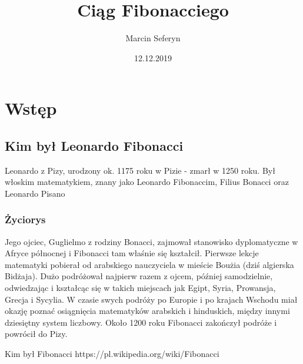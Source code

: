 \documentclass{report}
\title{Ciąg Fibonacciego}
\author{Marcin Seferyn}
\date{12.12.2019}
\begin{document}
\maketitle
\newpage
\tableofcontents
\newpage
\chapter{Wstęp}
\section{Kim był Leonardo Fibonacci}
\cite{fib}
Leonardo z Pizy, urodzony ok. 1175 roku w Pizie - zmarł w 1250 roku. Był włoskim matematykiem, znany jako Leonardo Fibonaccim, Filius Bonacci oraz Leonardo Pisano
\subsection{Życiorys}
Jego ojciec, Guglielmo z rodziny Bonacci, zajmował stanowisko dyplomatyczne w Afryce północnej i Fibonacci tam właśnie się kształcił. Pierwsze lekcje matematyki pobierał od arabskiego nauczyciela w mieście Boużia (dziś algierska Bidżaja). Dużo podróżował najpierw razem z ojcem, później samodzielnie, odwiedzając i kształcąc się w takich miejscach jak Egipt, Syria, Prowansja, Grecja i Sycylia. W czasie swych podróży po Europie i po krajach Wschodu miał okazję poznać osiągnięcia matematyków arabskich i hinduskich, między innymi dziesiętny system liczbowy.
Około 1200 roku Fibonacci zakończył podróże i powrócił do Pizy. 
\newpage
\begin{thebibliography}{9}
 Kim był Fibonacci https://pl.wikipedia.org/wiki/Fibonacci
\end{thebibliography}
\end{document}
